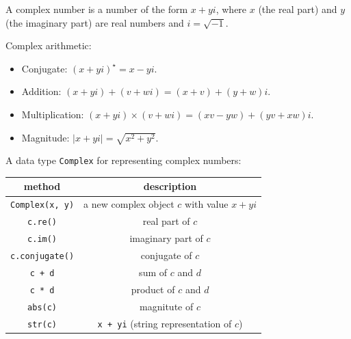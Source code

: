 \documentclass[8pt,a4paper,compress,handout]{beamer}
\begin{document}
\begin{frame}[fragile]
A complex number is a number of the form $x+yi$, where $x$ (the real part) and $y$ (the imaginary part) are real numbers and $i=\sqrt{-1}$.

\bigskip

Complex arithmetic:
\begin{itemize}
\item Conjugate: $(x+yi)^\star=x-yi$.
\item Addition: $(x+yi)+(v+wi) = (x+v) + (y+w)i$.

\item Multiplication: $(x+yi)\times(v+wi) = (xv-yw) + (yv+xw)i$.

\item Magnitude: $|x+yi|=\sqrt{x^2+y^2}$.
\end{itemize}

\bigskip

A data type \lstinline{Complex} for representing complex numbers:
\begin{center}
\begin{tabular}{cc}
method & description \\ \hline
\lstinline$Complex(x, y)$ & a new complex object $c$ with value $x + yi$ \\
\lstinline$c.re()$ & real part of $c$ \\
\lstinline$c.im()$ & imaginary part of $c$ \\
\lstinline$c.conjugate()$ & conjugate of $c$ \\
\lstinline$c + d$ & sum of $c$ and $d$ \\
\lstinline$c * d$ & product of $c$ and $d$ \\
\lstinline$abs(c)$ & magnitute of $c$ \\
\lstinline$str(c)$ & \lstinline$x + yi$ (string representation of $c$)
\end{tabular} 
\end{center}
\end{frame}
\end{document}
